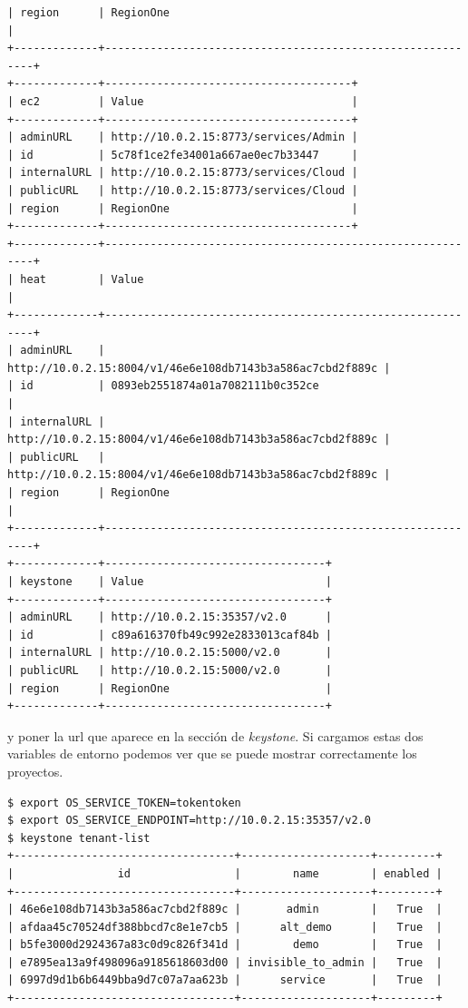 \documentclass{article}
\begin{document}
\begin{lstlisting}[style=miniBash]
| region      | RegionOne                                                 |
+-------------+-----------------------------------------------------------+
+-------------+--------------------------------------+
| ec2         | Value                                |
+-------------+--------------------------------------+
| adminURL    | http://10.0.2.15:8773/services/Admin |
| id          | 5c78f1ce2fe34001a667ae0ec7b33447     |
| internalURL | http://10.0.2.15:8773/services/Cloud |
| publicURL   | http://10.0.2.15:8773/services/Cloud |
| region      | RegionOne                            |
+-------------+--------------------------------------+
+-------------+-----------------------------------------------------------+
| heat        | Value                                                     |
+-------------+-----------------------------------------------------------+
| adminURL    | http://10.0.2.15:8004/v1/46e6e108db7143b3a586ac7cbd2f889c |
| id          | 0893eb2551874a01a7082111b0c352ce                          |
| internalURL | http://10.0.2.15:8004/v1/46e6e108db7143b3a586ac7cbd2f889c |
| publicURL   | http://10.0.2.15:8004/v1/46e6e108db7143b3a586ac7cbd2f889c |
| region      | RegionOne                                                 |
+-------------+-----------------------------------------------------------+
+-------------+----------------------------------+
| keystone    | Value                            |
+-------------+----------------------------------+
| adminURL    | http://10.0.2.15:35357/v2.0      |
| id          | c89a616370fb49c992e2833013caf84b |
| internalURL | http://10.0.2.15:5000/v2.0       |
| publicURL   | http://10.0.2.15:5000/v2.0       |
| region      | RegionOne                        |
+-------------+----------------------------------+
\end{lstlisting}	
	y poner la url que aparece en la sección de \emph{keystone}. Si cargamos estas dos variables de entorno podemos ver que se puede mostrar correctamente los proyectos.
\begin{lstlisting}[style=miniBash]
$ export OS_SERVICE_TOKEN=tokentoken
$ export OS_SERVICE_ENDPOINT=http://10.0.2.15:35357/v2.0
$ keystone tenant-list
+----------------------------------+--------------------+---------+
|                id                |        name        | enabled |
+----------------------------------+--------------------+---------+
| 46e6e108db7143b3a586ac7cbd2f889c |       admin        |   True  |
| afdaa45c70524df388bbcd7c8e1e7cb5 |      alt_demo      |   True  |
| b5fe3000d2924367a83c0d9c826f341d |        demo        |   True  |
| e7895ea13a9f498096a9185618603d00 | invisible_to_admin |   True  |
| 6997d9d1b6b6449bba9d7c07a7aa623b |      service       |   True  |
+----------------------------------+--------------------+---------+
\end{lstlisting}	
\end{document}
